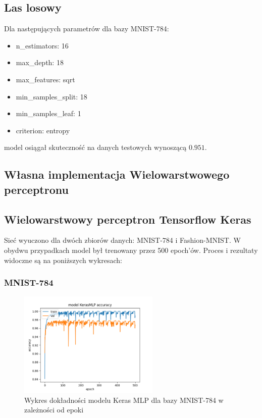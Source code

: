 \documentclass{article}
\begin{document}
\subsection{Las losowy}

Dla następujących parametrów dla bazy MNIST-784:

\begin{itemize}
    \item n\_estimators: 16
    \item max\_depth: 18
    \item max\_features: sqrt
    \item min\_samples\_split: 18
    \item min\_samples\_leaf: 1
    \item criterion: entropy
\end{itemize}
model osiągał skuteczność na danych testowych wynoszącą $0.951$.

\subsection{Własna implementacja Wielowarstwowego perceptronu}
\subsection{Wielowarstwowy perceptron Tensorflow Keras}

Sieć wyuczono dla dwóch zbiorów danych: MNIST-784 i Fashion-MNIST. 
W obydwu przypadkach model był trenowany przez 500 epoch'ów. 
Proces i rezultaty widoczne są na poniższych wykresach:

\subsubsection{MNIST-784}
\begin{figure}[H]
    \centering
    \includegraphics[width=0.6\textwidth]{../Saves/KerasMLP/mnist-784/KerasMLP_mnist_784_ep500_acc.png}
    \caption{Wykres dokładności modelu Keras MLP dla bazy MNIST-784 w zależności od epoki}
\end{figure}
\end{document}

